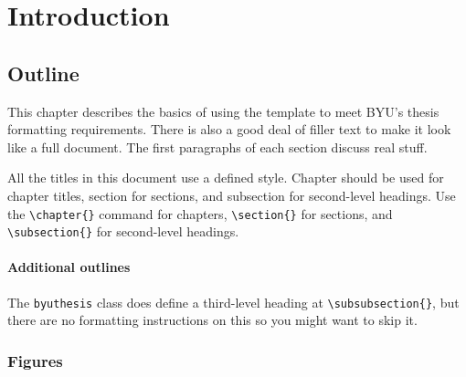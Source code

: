 \chapter{Introduction}

\section{Outline}

This chapter describes the basics of using the template to meet BYU's
thesis formatting requirements. There is also a good deal of filler text to
make it look like a full document. The first paragraphs of each section discuss
real stuff.

All the titles in this document use a defined style. Chapter should
be used for chapter titles, section for sections, and subsection for
second-level headings. Use the \verb+\chapter{}+ command for chapters,
\verb+\section{}+ for sections, and \verb+\subsection{}+ for second-level
headings.

\subsubsection{Additional outlines}

The \texttt{byuthesis} class does define a third-level heading
at \verb+\subsubsection{}+, but there are no formatting instructions on this so
you might want to skip it.


\lipsum[1]

\subsection{Figures}

